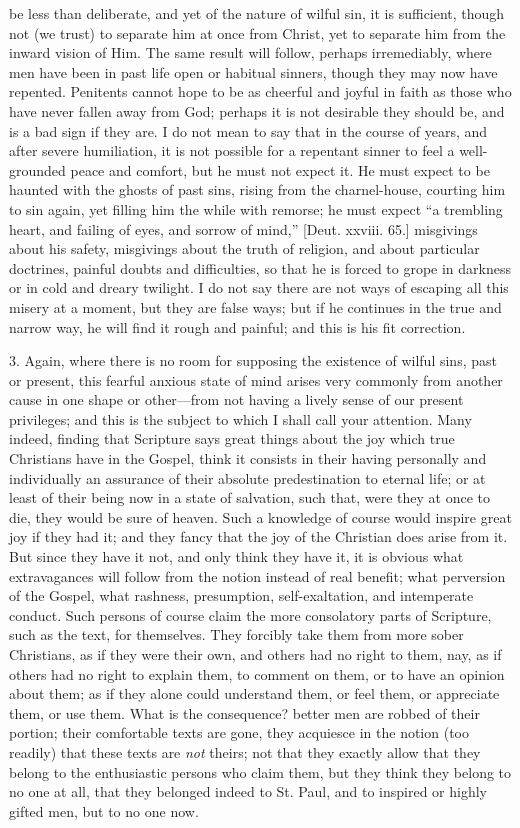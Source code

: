 be less than deliberate, and yet of the nature of wilful sin, it is
sufficient, though not (we trust) to separate him at once from Christ,
yet to separate him from the inward vision of Him. The same result
will follow, perhaps irremediably, where men have been in past life
open or habitual sinners, though they may now have repented. Penitents
cannot hope to be as cheerful and joyful in faith as those who have
never fallen away from God; perhaps it is not desirable they should
be, and is a bad sign if they are. I do not mean to say that in the
course of years, and after severe humiliation, it is not possible for
a repentant sinner to feel a well-grounded peace and comfort, but he
must not expect it. He must expect to be haunted with the ghosts of
past sins, rising from the charnel-house, courting him to sin again,
yet filling him the while with remorse; he must expect ``a
trembling heart, and failing of eyes, and sorrow of mind,'' [Deut.
xxviii. 65.] misgivings about his safety, misgivings about the truth
of religion, and about particular doctrines, painful doubts and
difficulties, so that he is forced to grope in darkness or in cold and
dreary twilight. I do not say there are not ways of escaping all this
misery at a moment, but they are false ways; but if he continues in
the true and narrow way, he will find it rough and painful; and this
is his fit correction.

3. Again, where there is no room for supposing the existence of
wilful sins, past or present, this fearful anxious state of mind
arises very commonly from another cause in one shape or other—from
not having a lively sense of our present privileges; and this is the
subject to which I shall call your attention. Many indeed, finding
that Scripture says great things about the joy which true Christians
have in the Gospel, think it consists in their having personally and
individually an assurance of their absolute predestination to eternal
life; or at least of their being now in a state of salvation, such
that, were they at once to die, they would be sure of heaven. Such a
knowledge of course would inspire great joy if they had it; and they
fancy that the joy of the Christian does arise from it. But since they
have it not, and only think they have it, it is obvious what
extravagances will follow from the notion instead of real benefit;
what perversion of the Gospel, what rashness, presumption,
self-exaltation, and intemperate conduct. Such persons of course claim
the more consolatory parts of Scripture, such as the text, for
themselves. They forcibly take them from more sober Christians, as if
they were their own, and others had no right to them, nay, as if
others had no right to explain them, to comment on them, or to have an
opinion about them; as if they alone could understand them, or feel
them, or appreciate them, or use them. What is the consequence? better
men are robbed of their portion; their comfortable texts are gone,
they acquiesce in the notion (too readily) that these texts are \emph{not}
theirs; not that they exactly allow that they belong to the
enthusiastic persons who claim them, but they think they belong to no
one at all, that they belonged indeed to St. Paul, and to inspired or
highly gifted men, but to no one now.

